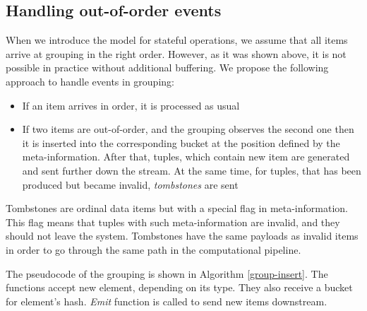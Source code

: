 \subsection{Handling out-of-order events}
When we introduce the model for stateful operations, we assume that all items arrive at grouping in the right order. However, as it was shown above, it is not possible in practice without additional buffering. We propose the following approach to handle events in grouping:

\begin{itemize}
    \item If an item arrives in order, it is processed as usual
    \item If two items are out-of-order, and the grouping observes the second one then it is inserted into the corresponding bucket at the position defined by the meta-information. After that, tuples, which contain new item are generated and sent further down the stream. At the same time, for tuples, that has been produced but became invalid, {\it tombstones} are sent
\end{itemize}

Tombstones are ordinal data items but with a special flag in meta-information. This flag means that tuples with such meta-information are invalid, and they should not leave the system. Tombstones have the same payloads as invalid items in order to go through the same path in the computational pipeline.

The pseudocode of the grouping is shown in Algorithm \ref{group-insert}. The functions accept new element, depending on its type. They also receive a bucket for element's hash. {\it Emit} function is called to send new items downstream.

